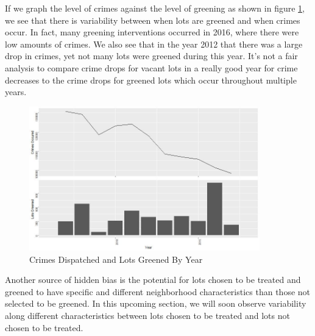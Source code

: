 \documentclass{article}
\begin{document}
    If we graph the level of crimes against the level of greening as shown in figure \ref{fig:figure2}, we see that there is variability between when lots are greened and when crimes occur. In fact, many greening interventions occurred in 2016, where there were low amounts of crimes. We also see that in the year 2012 that there was a large drop in crimes, yet not many lots were greened during this year. It's not a fair analysis to compare crime drops for vacant lots in a really good year for crime decreases to the crime drops for greened lots which occur throughout multiple years. 
    
    \begin{figure}[h]
    \includegraphics[width=10cm]{imgs/chart_crime_vs_green_lots.jpg}
    \centering
    \caption{Crimes Dispatched and Lots Greened By Year}
    \label{fig:figure2}
    \end{figure}
    
    Another source of hidden bias is the potential for lots chosen to be treated and greened to have specific and different neighborhood characteristics than those not selected to be greened. In this upcoming section, we will soon observe variability along different characteristics between lots chosen to be treated and lots not chosen to be treated.
    
\end{document}
